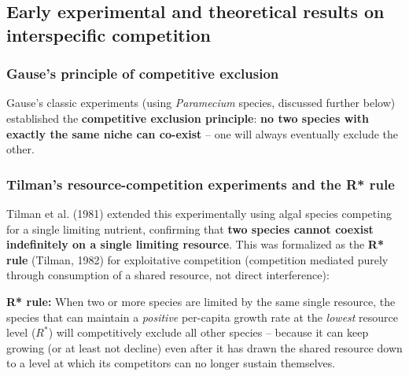 \documentclass[11pt,a4paper]{article}
\begin{document}
\subsection{Early experimental and theoretical results on interspecific competition}
\subsubsection*{Gause's principle of competitive exclusion}
Gause's classic experiments (using \emph{Paramecium} species, discussed further below) established the \textbf{competitive exclusion principle}: \textbf{no two species with exactly the same niche can co-exist} -- one will always eventually exclude the other.

\subsubsection*{Tilman's resource-competition experiments and the R* rule}
Tilman et al. (1981) extended this experimentally using algal species competing for a single limiting nutrient, confirming that \textbf{two species cannot coexist indefinitely on a single limiting resource}. This was formalized as the \textbf{R* rule} (Tilman, 1982) for exploitative competition (competition mediated purely through consumption of a shared resource, not direct interference):

\begin{keybox}
\textbf{R* rule:} When two or more species are limited by the same single resource, the species that can maintain a \emph{positive} per-capita growth rate at the \emph{lowest} resource level ($R^{*}$) will competitively exclude all other species -- because it can keep growing (or at least not decline) even after it has drawn the shared resource down to a level at which its competitors can no longer sustain themselves.
\end{keybox}
\end{document}
